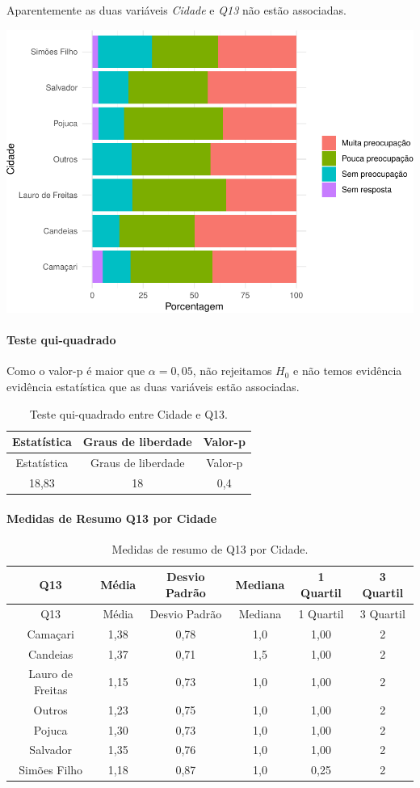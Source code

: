 \documentclass[]{article}
\let\oldparagraph\paragraph
\renewcommand{\paragraph}[1]{\oldparagraph{#1}\mbox{}}
\begin{document}
Aparentemente as duas variáveis \emph{Cidade} e \emph{Q13} não estão associadas.

\begin{center}\includegraphics[width=0.75\linewidth]{relatorio_files/figure-latex/unnamed-chunk-56-1} \end{center}

\hypertarget{teste-qui-quadrado-7}{%
\paragraph{Teste qui-quadrado}\label{teste-qui-quadrado-7}}

Como o valor-p é maior que \(\alpha=0,05\), não rejeitamos \(H_0\) e não temos evidência evidência estatística que as duas variáveis estão associadas.

\begin{longtable}[]{@{}ccc@{}}
\caption{\label{tab:unnamed-chunk-57}Teste qui-quadrado entre Cidade e Q13.}\tabularnewline
\toprule
Estatística & Graus de liberdade & Valor-p\tabularnewline
\midrule
\endfirsthead
\toprule
Estatística & Graus de liberdade & Valor-p\tabularnewline
\midrule
\endhead
18,83 & 18 & 0,4\tabularnewline
\bottomrule
\end{longtable}

\cleardoublepage

\hypertarget{medidas-de-resumo-q13-por-cidade}{%
\paragraph{Medidas de Resumo Q13 por Cidade}\label{medidas-de-resumo-q13-por-cidade}}

\begin{longtable}[]{@{}cccccc@{}}
\caption{\label{tab:unnamed-chunk-58}Medidas de resumo de Q13 por Cidade.}\tabularnewline
\toprule
Q13 & Média & Desvio Padrão & Mediana & 1 Quartil & 3 Quartil\tabularnewline
\midrule
\endfirsthead
\toprule
Q13 & Média & Desvio Padrão & Mediana & 1 Quartil & 3 Quartil\tabularnewline
\midrule
\endhead
Camaçari & 1,38 & 0,78 & 1,0 & 1,00 & 2\tabularnewline
Candeias & 1,37 & 0,71 & 1,5 & 1,00 & 2\tabularnewline
Lauro de Freitas & 1,15 & 0,73 & 1,0 & 1,00 & 2\tabularnewline
Outros & 1,23 & 0,75 & 1,0 & 1,00 & 2\tabularnewline
Pojuca & 1,30 & 0,73 & 1,0 & 1,00 & 2\tabularnewline
Salvador & 1,35 & 0,76 & 1,0 & 1,00 & 2\tabularnewline
Simões Filho & 1,18 & 0,87 & 1,0 & 0,25 & 2\tabularnewline
\bottomrule
\end{longtable}
\end{document}
